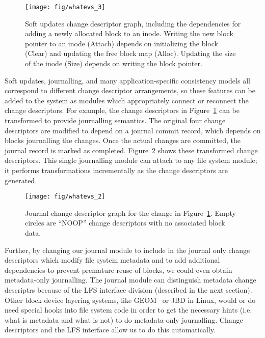 \begin{figure}[b]
  \centering
  \texttt{[image: fig/whatevs\_3]}%
  \caption{\label{fig:softupdates} Soft updates change descriptor graph,
  including the dependencies for adding a newly allocated block to an
  inode. Writing the new block pointer to an inode (Attach) depends on
  initializing the block (Clear) and updating the free block map (Alloc).
  Updating the size of the inode (Size) depends on writing the block
  pointer.}
\end{figure}

Soft updates, journalling, and many application-specific consistency models all
correspond to different change descriptor arrangements, so these features can be
added to the system as modules which appropriately connect or reconnect the
change descriptors.
%
For example, the change descriptors in Figure~\ref{fig:softupdates} can be
transformed to provide journalling semantics. The original four change
descriptors are modified to depend on a journal commit record, which
depends on blocks journalling the changes. Once the actual changes are
committed, the journal record is marked as completed.
Figure~\ref{fig:journal} shows these transformed change descriptors.
%
This single journalling module can attach to any file system module;
it performs transformations incrementally as the change descriptors
are generated.

\begin{figure}
  \centering
  \texttt{[image: fig/whatevs\_2]}%
  \caption{\label{fig:journal} Journal change descriptor graph for the
    change in Figure~\ref{fig:softupdates}. Empty circles are
    ``NOOP'' change descriptors with no associated block data.}
\end{figure}

Further, by changing our journal module to include in the journal only
change descriptors which modify file system metadata and to add
additional dependencies to prevent premature reuse of blocks, we could
even obtain metadata-only journalling. The journal module can
distinguish metadata change descriptrs because of the LFS interface
division (described in the next section).
%
Other block device layering
systems, like GEOM~\cite{geom} or JBD in Linux, would or do need special hooks
into file system code in order to get the necessary hints (i.e.  what is
metadata and what is not) to do metadata-only journalling. Change descriptors
and the LFS interface allow us to do this automatically.
